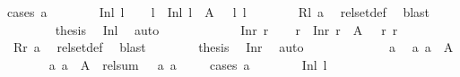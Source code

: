 \begin{isabellebody}
{\isacharparenleft}cases\ a{}{\isacharparenright}\isanewline
\ \ \ \ \ \ \isamarkupfalse%
\ {\isacharparenleft}Inl\ l{}{\isacharparenright}\ \isamarkupfalse%
\ \isamarkupfalse%
\ l{}\ \ {\isachardoublequoteopen}Inl\ l{}\ {\isasymin}\ A{}\ {\isasymand}\ {\isasymchi}\ l{}\ l{}{\isachardoublequoteclose}\isanewline
\ \ \ \ \ \ \isamarkupfalse%
\ Rl\ a{}\ \isamarkupfalse%
\ rel{\isacharunderscore}set{\isacharunderscore}def\ \isamarkupfalse%
\ blast\isanewline
\ \ \ \ \ \ \isamarkupfalse%
\ {\isacharquery}thesis\ \isamarkupfalse%
\ Inl\ \isamarkupfalse%
\ auto\isanewline
\ \ \ \ \isamarkupfalse%
\isanewline
\ \ \ \ \ \ \isamarkupfalse%
\ {\isacharparenleft}Inr\ r{}{\isacharparenright}\ \isamarkupfalse%
\ \isamarkupfalse%
\ r{}\ \ {\isachardoublequoteopen}Inr\ r{}\ {\isasymin}\ A{}\ {\isasymand}\ {\isasymphi}\ r{}\ r{}{\isachardoublequoteclose}\isanewline
\ \ \ \ \ \ \isamarkupfalse%
\ Rr\ a{}\ \isamarkupfalse%
\ rel{\isacharunderscore}set{\isacharunderscore}def\ \isamarkupfalse%
\ blast\isanewline
\ \ \ \ \ \ \isamarkupfalse%
\ {\isacharquery}thesis\ \isamarkupfalse%
\ Inr\ \isamarkupfalse%
\ auto\isanewline
\ \ \ \ \isamarkupfalse%
\isanewline
\ \ \isamarkupfalse%
\isanewline
\ \ \ \ \isamarkupfalse%
\ a{}\ \isamarkupfalse%
\ a{}{\isacharcolon}\ {\isachardoublequoteopen}a{}\ {\isasymin}\ A{}{\isachardoublequoteclose}\isanewline
\ \ \ \ \isamarkupfalse%
\ {\isachardoublequoteopen}{\isasymexists}\ a{}{\isachardot}\ a{}\ {\isasymin}\ A{}\ {\isasymand}\ rel{\isacharunderscore}sum\ {\isasymchi}\ {\isasymphi}\ a{}\ a{}{\isachardoublequoteclose}\isanewline
\ \ \ \ \isamarkupfalse%
{\isacharparenleft}cases\ a{}{\isacharparenright}\isanewline
\ \ \ \ \ \ \isamarkupfalse%
\ {\isacharparenleft}Inl\ l{}{\isacharparenright}\ \isamarkupfalse%
\ \isamarkupfalse%

\end{isabellebody}
